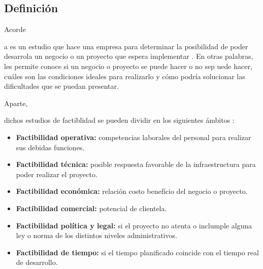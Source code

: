 \documentclass[stu, 12pt, letterpaper, donotrepeattitle, floatsintext, natbib]{apa7}
\begin{document}
\subsection{Definición}
Acorde \begin{justifying}
    a %
    es un estudio que hace una empresa para determinar la posibilidad de poder desarrola un negocio o un proyecto que espera implementar \citep{quiroa-2021}. En otras palabras,
    les permite conoce si un negocio o proyecto se puede hacer o no sep uede hacer, cuáles son las condiciones ideales para realizarlo y cómo podría solucionar las
    dificultades que se puedan presentar.\par
\end{justifying}
Aparte, \begin{justifying}
    dichos estudios de factiblidad se pueden dividir en los siguientes ámbitos \citep{unknown-author-2019}:
\begin{itemize}
    \item \textbf{Factibilidad operativa:} competencias laborales del personal para realizar sus debidas funciones.
    \item \textbf{Factibilidad técnica:} posible respuesta favorable de la infraestructura para poder realizar el proyecto.
    \item \textbf{Factibilidad económica:} relación costo benefício del negocio o proyecto.
    \item \textbf{Factibilidad comercial:} potencial de clientela.
    \item \textbf{Factibilidad política y legal:} si el proyecto no atenta o inclumple alguna ley o norma de los distintos niveles administrativos.
    \item \textbf{Factibilidad de tiempo:} si el tiempo planificado coincide con el tiempo real de desarrollo.
\end{itemize}\par
\end{justifying}
\vspace{\baselineskip}
\end{document}
